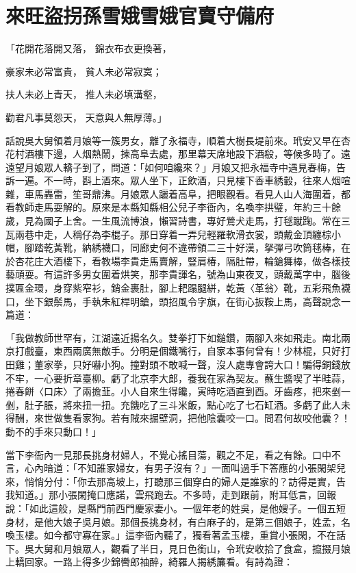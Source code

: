 %

\chapter{來旺盜拐孫雪娥\KG 雪娥官賣守備府}

「花開花落開又落，  錦衣布衣更換著，

豪家未必常富貴，  貧人未必常寂寞；

扶人未必上青天，  推人未必填溝壑，

勸君凡事莫怨天，  天意與人無厚薄。」

話說吳大舅領着月娘等一簇男女，離了永福寺，順着大樹長堤前來。玳安又早在杏花村酒樓下邊，人烟熱鬧，揀高阜去處，那里幕天席地設下酒殽，等候多時了。遠遠望月娘眾人轎子到了，問道：「如何咱纔來？」月娘又把永福寺中遇見春梅，告訴一遍。不一時，斟上酒來。眾人坐下，正飲酒，只見樓下香車綉轂，往來人烟喧雜，車馬轟雷，笙哥鼎沸。月娘眾人躧着高阜，把眼觀看。看見人山人海圍着，都看教師走馬耍解的。原來是本縣知縣相公兒子李衙內，名喚李拱璧，年約三十餘歲，見為國子上舍。一生風流博浪，懶習詩書，專好鶯犬走馬，打毬蹴踘。常在三瓦兩巷中走，人稱仔為李棍子。那日穿着一弄兒輕羅軟滑衣裳，頭戴金頂纏棕小帽，腳踏乾黃靴，納綉襪口，同廊史何不違帶領二三十好漢，拏彈弓吹筒毬棒，在於杏花庄大酒樓下，看教場李貴走馬賣解，豎肩椿，隔肚帶，輪鎗舞棒，做各樣技藝頑耍。有這許多男女圍着烘笑，那李貴諢名，號為山東夜叉，頭戴萬字中，腦後撲匾金環，身穿紫窄衫，銷金裹肚，腳上耙蹋腿絣，乾黃〈革翁〉靴，五彩飛魚襪口，坐下銀鬃馬，手執朱紅桿明鎗，頭招風令字旗，在街心扳鞍上馬，高聲說念一篇道：

「我做教師世罕有，江湖遠近揚名久。雙拳打下如鎚鑽，兩腳入來如飛走。南北兩京打戲臺，東西兩廣無敵手。分明是個鐵嘴行，自家本事何曾有！少林棍，只好打田雞；董家拳，只好嚇小狗。撞對頭不敢喊一聲，沒人處專會誇大口！騙得銅錢放不牢，一心要折章臺柳。虧了北京李大郎，養我在家為契友。蘸生醬喫了半畦蒜，捲春餅〈口床〉了兩擔韮。小人自來生得饞，寅時吃酒直到酉。牙齒疼，把來剉一剉，肚子脹，將來扭一扭。充饑吃了三斗米飯，點心吃了七石缸酒。多虧了此人未得酬，來世做隻看家狗。若有賊來掘壁洞，把他陰囊咬一口。問君何故咬他囊？！動不的手來只動口！」

當下李衙內一見那長挑身材婦人，不覺心搖目蕩，觀之不足，看之有餘。口中不言，心內暗道：「不知誰家婦女，有男子沒有？」一面叫過手下答應的小張閑架兒來，悄悄分付：「你去那高坡上，打聽那三個穿白的婦人是誰家的？訪得是實，告我知道。」那小張閑掩口應諾，雲飛跑去。不多時，走到跟前，附耳低言，回報說：「如此這般，是縣門前西門慶家妻小。一個年老的姓吳，是他嫂子。一個五短身材，是他大娘子吳月娘。那個長挑身材，有白麻子的，是第三個娘子，姓孟，名喚玉樓。如今都守寡在家。」這李衙內聽了，獨看著孟玉樓，重賞小張閑，不在話下。吳大舅和月娘眾人，觀看了半日，見日色銜山，令玳安收拾了食盒，攛掇月娘上轎回家。一路上得多少錦轡郎袖醉，綺羅人揭綉簾看。有詩為證：

